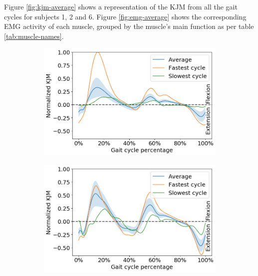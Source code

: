 \documentclass[../main.tex]{subfiles}
\begin{document}
Figure \ref{fig:kjm-average} shows a representation of the \ac{KJM} from all the gait cycles for subjects 1, 2 and 6.
Figure \ref{fig:emg-average} shows the corresponding \ac{EMG} activity of each muscle, grouped by the muscle's main function as per table \ref{tab:muscle-names}.
\begin{figure}[ht!]
     \centering
     \begin{subfigure}[b]{0.49\textwidth}
         \centering
         \includegraphics[width=\textwidth]{img/results/moment_avg/subject01_all_set1_moment_avg_w_minmax.png}
     \end{subfigure}
     \hfill
     \begin{subfigure}[b]{0.49\textwidth}
         \centering
         \includegraphics[width=\textwidth]{img/results/moment_avg/subject02_all_set1_moment_avg_w_minmax.png}
     \end{subfigure}
     \hfill
     \begin{subfigure}[b]{0.49\textwidth}
         \centering

\end{subfigure}
\end{figure}
\end{document}
